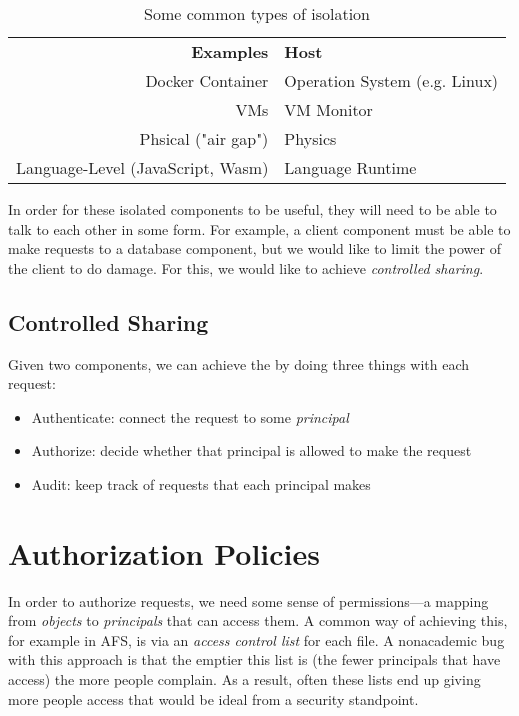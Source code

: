 \begin{table}[htpb]
	\centering
	\caption{Some common types of isolation}
	\label{tab:isolationtypes}

	\begin{tabular}{rl}
		\textbf{Examples} & \textbf{Host} \\
		Docker Container & Operation System (e.g. Linux) \\
		VMs & VM Monitor \\
		Phsical ("air gap") & Physics \\
		Language-Level (JavaScript, Wasm) & Language Runtime \\
	\end{tabular}
\end{table}

In order for these isolated components to be useful, they will need to be able to talk to each other in some form. For example, a client component must be able to make requests to a database component, but we would like to limit the power of the client to do damage. For this, we would like to achieve \textit{controlled sharing}.

\subsection{Controlled Sharing}
Given two components, we can achieve the  by doing three things with each request:
\begin{itemize}
	\item Authenticate: connect the request to some \emph{principal}
	\item Authorize: decide whether that principal is allowed to make the request
	\item Audit: keep track of requests that each principal makes
\end{itemize}

\section{Authorization Policies}
In order to authorize requests, we need some sense of permissions---a mapping from \emph{objects} to \emph{principals} that can access them. A common way of achieving this, for example in AFS, is via an \emph{access control list} for each file. A nonacademic bug with this approach is that the emptier this list is (the fewer principals that have access) the more people complain. As a result, often these lists end up giving more people access that would be ideal from a security standpoint.

